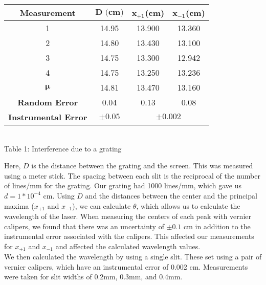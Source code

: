 \begin{center}
    \begin{tabular}{|c|c|c c|}
        \hline
        \textbf{Measurement} & $\bm{D\textbf{ (cm)}}$ & $\bm{x_{+1}}$\textbf{(cm)} & $\bm{x_{-1}}$\textbf{(cm)} \\ \hline
        1 & 14.95 & 13.900 & 13.360 \\ 
        2 & 14.80 & 13.430 & 13.100 \\ 
        3 & 14.75 & 13.300 & 12.942 \\ 
        4 & 14.75 & 13.250 & 13.236 \\  \hline \hline
        $\bm{\mu}$ & 14.81 & 13.470 & 13.160 \\  
        \textbf{Random Error} & 0.04 & 0.13 & 0.08 \\ 
        \textbf{Instrumental Error} & $\pm 0.05$ & \multicolumn{2}{c|}{$\pm 0.002$} \\ \hline
    \end{tabular}
    \vspace{3mm}
    \\Table 1: Interference due to a grating  \\
\end{center}
Here, $D$ is the distance between the grating and the screen. This was measured using a meter stick. 
The spacing between each slit is the reciprocal of the number of lines/mm for the grating. Our grating had 1000 lines/mm, which gave us $d=1*10^{-4}$ cm.
Using $D$ and the distances between the center and the principal maxima ($x_{+1}$ and  $x_{-1}$), we can calculate $\theta$, which allows us to calculate the wavelength of the laser.
When measuring the centers of each peak with vernier calipers, we found that there was an uncertainty of $\pm 0.1$ cm in addition to the instrumental error associated with the calipers.  
This affected our measurements for $x_{+1}$ and $x_{-1}$ and affected the calculated wavelength values.\\
We then calculated the wavelength by using a single slit. These set using a pair of vernier calipers, which have an instrumental error of 0.002 cm. Measurements were taken for slit widths of 0.2mm, 0.3mm, and 0.4mm.
